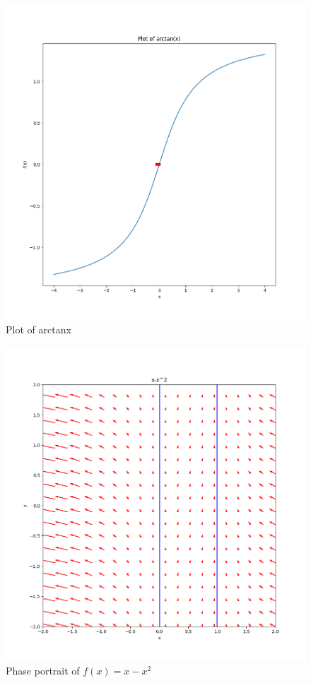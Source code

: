 \documentclass[11pt]{article}
\begin{document}
\begin{figure}[h]
    \centering
    \includegraphics{Figure_4.png}
    \caption{Plot of arctan{x}}
    \label{fig:arctan}
\end{figure}



\begin{figure}[h!]
    \centering
    \includegraphics{phase1.png}
    \caption{Phase portrait of $f(x) = x − x^2$}
    \label{fig:phase1}
\end{figure}
\end{document}
